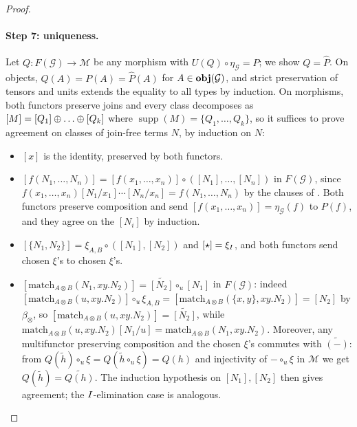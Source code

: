 \begin{proof}
\paragraph{Step 7: uniqueness.}
Let $Q : F(\mathcal{G}) \to \mathcal{M}$ be any morphism with $U(Q) \circ \eta_{\mathcal{G}} = P$; we show $Q = \hat{P}$.
On objects, $Q(A) = P(A) = \hat{P}(A)$ for $A \in {\mathbf{obj}(\mathcal{G})}$, and strict preservation of tensors and units extends the equality to all types by induction.
On morphisms, both functors preserve joins and every class decomposes as $[M] = [Q_1] \mathbin{\oplus} \ldots \mathbin{\oplus} [Q_k]$ where $\operatorname{supp}(M) = \{Q_1, \ldots, Q_k\}$, so it suffices to prove agreement on classes of join-free terms $N$, by induction on $N$:
\begin{itemize}
  \item $[x]$ is the identity, preserved by both functors.
  \item $[f(N_1, \ldots, N_n)] = [f(x_1, \ldots, x_n)] \circ ([N_1], \ldots, [N_n])$ in $F(\mathcal{G})$, since $f(x_1, \ldots, x_n)[N_1/x_1] \cdots [N_n/x_n] = f(N_1, \ldots, N_n)$ by the clauses of .
  Both functors preserve composition and send $[f(x_1, \ldots, x_n)] = \eta_{\mathcal{G}}(f)$ to $P(f)$, and they agree on the $[N_i]$ by induction.
  \item $[\{N_1, N_2\}] = \xi_{A,B} \circ ([N_1], [N_2])$ and $[\star] = \xi_{I}$, and both functors send chosen $\xi$'s to chosen $\xi$'s.
  \item $[\text{match}_{A \otimes B}(N_1, xy.N_2)] = \widetilde{[N_2]} \circ_u [N_1]$ in $F(\mathcal{G})$: indeed $[\text{match}_{A \otimes B}(u, xy.N_2)] \circ_u \xi_{A,B} = [\text{match}_{A \otimes B}(\{x,y\}, xy.N_2)] = [N_2]$ by $\beta_{\otimes}$, so $[\text{match}_{A \otimes B}(u, xy.N_2)] = \widetilde{[N_2]}$, while $\text{match}_{A \otimes B}(u, xy.N_2)[N_1/u] = \text{match}_{A \otimes B}(N_1, xy.N_2)$.
  Moreover, any multifunctor preserving composition and the chosen $\xi$'s commutes with $\widetilde{(-)}$: from $Q(\widetilde{h}) \circ_u \xi = Q(\widetilde{h} \circ_u \xi) = Q(h)$ and injectivity of $- \circ_u \xi$ in $\mathcal{M}$ we get $Q(\widetilde{h}) = \widetilde{Q(h)}$.
  The induction hypothesis on $[N_1], [N_2]$ then gives agreement; the $I$-elimination case is analogous.
\end{itemize}


\end{proof}
